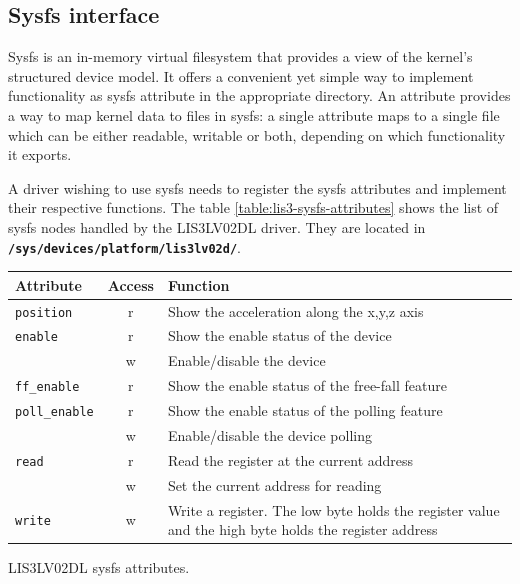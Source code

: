 \documentclass[a4paper,10pt]{article}
\makeatletter
\newenvironment{tablehere}{\def\@captype{table}}{}
\newcommand{\keyword}[1]{\texttt{\textbf{#1}}}
\makeatother
\begin{document}
\begin{multicols}{2}
\subsection{Sysfs interface}
\label{sec:lis3_sysfs}

Sysfs is an in-memory virtual filesystem that provides a view of the kernel's
structured device model. It offers a convenient yet simple way to implement
functionality as sysfs attribute in the appropriate directory. An attribute
provides a way to map kernel data to files in sysfs: a single attribute maps to
a single file which can be either readable, writable or both, depending on which
functionality it exports.

A driver wishing to use sysfs needs to register the sysfs attributes and implement
their respective functions. The table \ref{table:lis3-sysfs-attributes} shows
the list of sysfs nodes handled by the LIS3LV02DL driver. They are located in
\keyword{/sys/devices/platform/lis3lv02d/}.

\begin{tablehere}
	\centering
	\renewcommand{\arraystretch}{1.2}	
	\begin{tabular}{l c p{4cm}}
		\hline
		Attribute & Access & Function \\
		\hline
		\texttt{position} & r & Show the acceleration along the x,y,z axis \\
		\hline
		\texttt{enable} & r & Show the enable status of the device \\
						& w & Enable/disable the device \\
		\hline
		\texttt{ff\_enable} & r & Show the enable status of the free-fall 
					 			  feature \\
		\hline
		\texttt{poll\_enable} & r & Show the enable status of the polling
									feature \\
							  & w & Enable/disable the device polling \\
		\hline
		\texttt{read} & r & Read the register at the current address \\
					  & w & Set the current address for reading \\
		\hline
		\texttt{write} & w & Write a register. The low byte holds the register
							 value and the high byte holds the register address \\
		\hline
	\end{tabular}
	\caption{LIS3LV02DL sysfs attributes.}
	\label{table:lis3-sysfs-attributes}
\end{tablehere}


\end{multicols}
\end{document}
